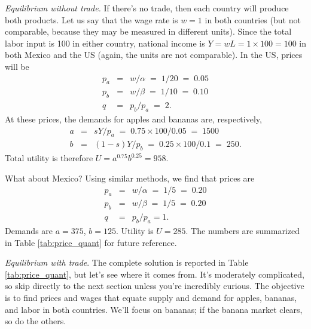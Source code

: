 \documentclass[letterpaper,12pt]{article}
\begin{document}
\textit{Equilibrium without trade.} If there's no trade, then each
country will produce both products.  Let us say that the wage rate
is $w = 1$ in both countries (but not comparable, because they may
be measured in different units).  Since the total labor input
is 100 in either country, national income is $Y = wL = 1\times 100
= 100$ in both Mexico and the US (again, the units are not comparable).
In the US, prices will be
\begin{eqnarray*}
    p_{a} &=& w/\alpha \;=\; {1}/{20} \;=\; 0.05\\
    p_{b} &=& {w}/{\beta} \;=\; {1}/{10} \;=\; 0.10\\
    q &=& {p_{b}}/{p_{a}} \;=\; 2.
\end{eqnarray*}
At these prices, the demands for apples and bananas are, respectively,
\begin{eqnarray*}
    a &=& {sY}/{p_{a}} \;=\; {0.75\times 100}/{0.05} \;=\; 1500\\
    b &=& {(1-s)Y}/{p_{b}} \;=\; {0.25\times 100}/{0.1} \;=\; 250 .
\end{eqnarray*}
Total utility is therefore $U = a^{0.75}b^{0.25} = 958$.

What about Mexico? Using similar methods, we find that prices are
%
\begin{eqnarray*}
    p_{a} &=&  {w}/{\alpha} \;=\; {1}/{5} \;=\; 0.20 \\
    p_{b} &=&  {w}/{\beta} \;=\; {1}/{5} \;=\; 0.20 \\
    q &=& {p_{b}}/{p_{a}} = 1.
\end{eqnarray*}
Demands are $a = 375$, $b = 125$. Utility is $U = 285$.  The
numbers are summarized in Table \ref{tab:price_quant} for future
reference.


\textit{Equilibrium with trade}.
The complete solution is reported in Table \ref{tab:price_quant},
but let's see where it comes from.
It's moderately complicated,
so skip directly to the next section unless you're
incredibly curious.
The objective is to find prices and wages that equate
supply and demand for apples, bananas, and labor in both countries.
We'll focus on bananas; if the banana market clears,
so do the others.


\end{document}
